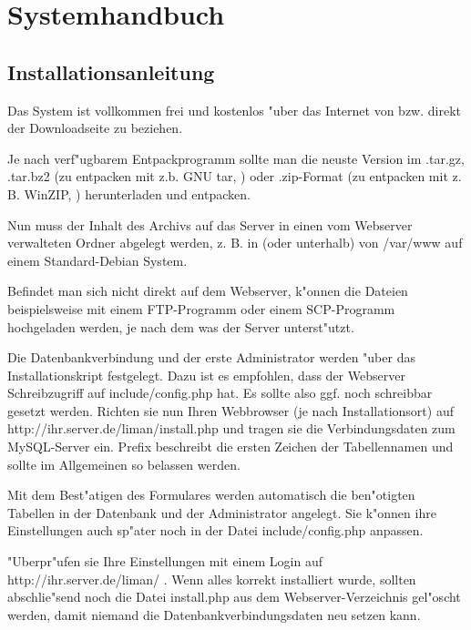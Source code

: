 \chapter{Systemhandbuch}
\section{Installationsanleitung}
Das System ist vollkommen frei und kostenlos "uber das Internet von  
bzw. direkt der 
Downloadseite  
zu beziehen.

Je nach verf"ugbarem Entpackprogramm sollte man die neuste Version im .tar.gz, 
.tar.bz2 (zu entpacken mit z.b. GNU tar, ) oder .zip-Format 
(zu entpacken mit z. B. WinZIP, ) herunterladen und entpacken.

Nun muss der Inhalt des Archivs auf das Server in einen vom Webserver verwalteten Ordner 
abgelegt werden, z. B. in (oder unterhalb) von /var/www auf einem Standard-Debian System.

Befindet man sich nicht direkt auf dem Webserver, k"onnen die Dateien beispielsweise mit 
einem FTP-Programm oder einem SCP-Programm hochgeladen werden, je nach dem was der Server 
unterst"utzt.

Die Datenbankverbindung und der erste Administrator werden "uber das Installationskript 
festgelegt. Dazu ist es empfohlen, dass der Webserver Schreibzugriff auf include/config.php
hat. Es sollte also ggf. noch schreibbar gesetzt werden. Richten sie nun Ihren Webbrowser 
(je nach Installationsort) auf http://ihr.server.de/liman/install.php und tragen sie die 
Verbindungsdaten zum MySQL-Server ein.
Prefix beschreibt die ersten Zeichen der Tabellennamen und sollte im Allgemeinen so belassen
werden.

Mit dem Best"atigen des Formulares werden automatisch die ben"otigten Tabellen in der Datenbank 
und der Administrator angelegt. Sie k"onnen ihre Einstellungen auch sp"ater noch in der Datei
include/config.php anpassen.

"Uberpr"ufen sie Ihre Einstellungen mit einem Login auf http://ihr.server.de/liman/ .
Wenn alles korrekt installiert wurde, sollten abschlie"send noch die Datei install.php 
aus dem Webserver-Verzeichnis gel"oscht werden, damit niemand die Datenbankverbindungsdaten neu 
setzen kann.

